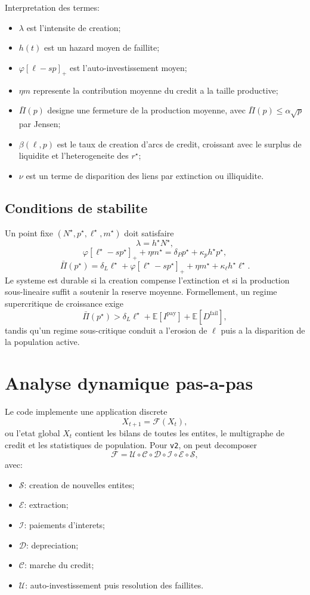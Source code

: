 \documentclass[11pt,a4paper]{article}
\begin{document}
Interpretation des termes:
\begin{itemize}
\item $\lambda$ est l'intensite de creation;
\item $h(t)$ est un hazard moyen de faillite;
\item $\varphi[\ell-sp]_+$ est l'auto-investissement moyen;
\item $\eta m$ represente la contribution moyenne du credit a la taille productive;
\item $\bar \Pi(p)$ designe une fermeture de la production moyenne, avec $\bar \Pi(p)\le \alpha\sqrt p$ par Jensen;
\item $\beta(\ell,p)$ est le taux de creation d'arcs de credit, croissant avec le surplus de liquidite et l'heterogeneite des $r^\star$;
\item $\nu$ est un terme de disparition des liens par extinction ou illiquidite.
\end{itemize}

\subsection{Conditions de stabilite}
Un point fixe $(N^\star,p^\star,\ell^\star,m^\star)$ doit satisfaire
\[
\lambda = h^\star N^\star,
\]
\[
\varphi[\ell^\star-sp^\star]_+ + \eta m^\star = \delta_P p^\star + \kappa_p h^\star p^\star,
\]
\[
\bar \Pi(p^\star)
=
\delta_L\ell^\star + \varphi[\ell^\star-sp^\star]_+ + \eta m^\star + \kappa_\ell h^\star \ell^\star.
\]
Le systeme est durable si la creation compense l'extinction et si la production sous-lineaire suffit a soutenir la reserve moyenne. Formellement, un regime supercritique de croissance exige
\[
\bar \Pi(p^\star)
>
\delta_L\ell^\star + \mathbb{E}[I^{\mathrm{pay}}] + \mathbb{E}[D^{\mathrm{fail}}],
\]
tandis qu'un regime sous-critique conduit a l'erosion de $\ell$ puis a la disparition de la population active.

\section{Analyse dynamique pas-a-pas}
Le code implemente une application discrete
\[
X_{t+1}=\mathcal F(X_t),
\]
ou l'etat global $X_t$ contient les bilans de toutes les entites, le multigraphe de credit et les statistiques de population. Pour \texttt{v2}, on peut decomposer
\[
\mathcal F=\mathcal U \circ \mathcal C \circ \mathcal D \circ \mathcal I \circ \mathcal E \circ \mathcal S,
\]
avec:
\begin{itemize}
\item $\mathcal S$: creation de nouvelles entites;
\item $\mathcal E$: extraction;
\item $\mathcal I$: paiements d'interets;
\item $\mathcal D$: depreciation;
\item $\mathcal C$: marche du credit;
\item $\mathcal U$: auto-investissement puis resolution des faillites.
\end{itemize}
\end{document}
